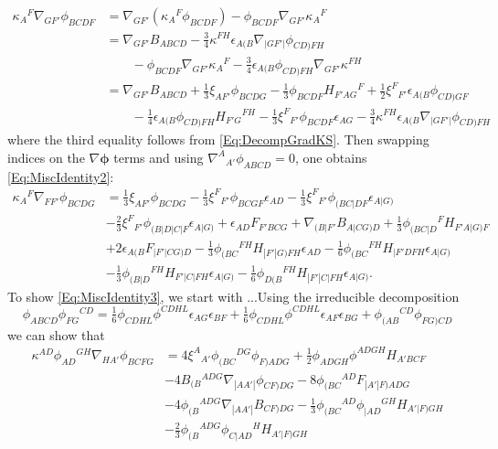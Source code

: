 \documentclass[10pt,a4paper]{article}
\theoremstyle{plain}
\begin{document}
\begin{align*}
	\kappa_{A}{}^{F} \nabla_{GF'}\phi_{BCDF} &= \nabla_{GF'}(\kappa_{A}{}^{F}\phi_{BCDF}) - \phi_{BCDF}\nabla_{GF'}\kappa_{A}{}^{F}\\
	&= \nabla_{GF'}B_{ABCD} -     \tfrac{3}{4} \kappa^{FH} \epsilon_{A(B} \nabla_{\vert GF'\vert}\phi_{CD)FH}\\
	&\qquad -  \phi_{BCDF} \nabla_{GF'}\kappa_{A}{}^{F} -  \tfrac{3}{4} \epsilon_{A(B}\phi_{CD)FH} \nabla_{GF'}\kappa^{FH}\\
	&=\nabla_{GF'}B_{ABCD} + \tfrac{1}{3} \xi_{AF'} \phi_{BCDG} -  \tfrac{1}{3} \phi_{BCDF} H_{F'AG}{}^{F} + \tfrac{1}{2} \xi^{F}{}_{F'}\epsilon_{A(B} \phi_{CD)GF}  \\
	&\qquad -  \tfrac{1}{4} \epsilon_{A(B}\phi_{CD)FH} H_{F'G}{}^{FH}   -  \tfrac{1}{3} \xi^{F}{}_{F'} \phi_{BCDF} \epsilon_{AG}  -  \tfrac{3}{4} \kappa^{FH} \epsilon_{A(B} \nabla_{\vert GF'\vert}\phi_{CD)FH}
\end{align*}
where the third equality follows from \eqref{Eq:DecompGradKS}. Then swapping indices on the $\nabla\bm\phi$ terms and using $\nabla^A{}_{A'}\phi_{ABCD}=0$, one obtains \eqref{Eq:MiscIdentity2}:
\begin{align*}
    \kappa_{A}{}^{F} \nabla_{FF'}\phi_{BCDG} &= \tfrac{1}{3} \xi_{AF'}
    \phi_{BCDG} - \tfrac{1}{3} \xi^{F}{}_{F'} \phi_{BCGF}
    \epsilon_{AD} - \tfrac{1}{3}
    \xi^{F}{}_{F'}\phi_{(BC|DF}\epsilon_{A|G)} \nonumber \\ & -
    \tfrac{2}{3} \xi^{F}{}_{F'}\phi_{(B|D|C|F}\epsilon_{A|G)} +
    \epsilon_{AD} F_{F'BCG} + \nabla_{(B|F'}B_{A|CG)D} + \tfrac{1}{3}
    \phi_{(BC|D}{}^{F}H_{F'A|G)F} \nonumber \\& + 2
    \epsilon_{A(B}F_{|F'\vert CG)D} - \tfrac{1}{3}
    \phi_{(BC}{}^{FH}H_{|F'|G)FH}\epsilon_{AD} - \tfrac{1}{6}
    \phi_{(BC}{}^{FH}H_{|F'DFH}\epsilon_{A|G)} \nonumber\\ & -
    \tfrac{1}{3} \phi_{(B|D}{}^{FH}H_{F'|C|FH}\epsilon_{A|G)} -
    \tfrac{1}{6}
    \phi_{D(B}{}^{FH}H_{|F'|C|FH}\epsilon_{A|G)}.
\end{align*}
To show \eqref{Eq:MiscIdentity3}, we start with ...Using the irreducible decomposition
\begin{equation*}
\phi_{ABCD} \phi_{FG}{}^{CD} = \tfrac{1}{6} \phi_{CDHL} \phi^{CDHL}
\epsilon_{AG} \epsilon_{BF} + \tfrac{1}{6} \phi_{CDHL} \phi^{CDHL}
\epsilon_{AF} \epsilon_{BG} +
\phi_{(AB}{}^{CD}\phi_{FG)CD} \label{Eq:DecompPhiSquared}
\end{equation*}
we can show that
\begin{align*}
    \kappa^{AD} \phi_{AD}{}^{GH} \nabla_{HA'}\phi_{BCFG} &= 4
    \xi^{A}{}_{A'}\phi_{(BC}{}^{DG}\phi_{F)ADG} + \tfrac{1}{2}
    \phi_{ADGH} \phi^{ADGH} H_{A'BCF} \nonumber\\ & - 4
    B_{(B}{}^{ADG}\nabla_{|AA'|}\phi_{CF)DG} - 8
    \phi_{(BC}{}^{AD}F_{|A'|F)ADG}\nonumber \\ & - 4
    \phi_{(B}{}^{ADG}\nabla_{|AA'|}B_{CF)DG} - \tfrac{1}{3}
    \phi_{(BC}{}^{AD}\phi_{|AD}{}^{GH}H_{A'|F)GH}\nonumber \\ & -
    \tfrac{2}{3}
    \phi_{(B}{}^{ADG}\phi_{C|AD}{}^{H}H_{A'|F)GH} \label{Eq:MiscIdentity3}
\end{align*}
\end{document}
